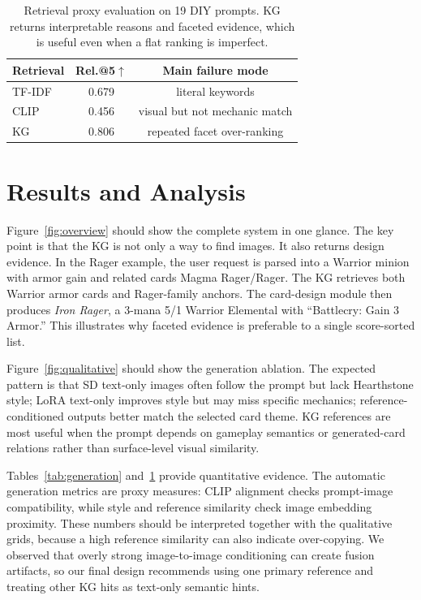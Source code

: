 \documentclass[10pt,twocolumn,letterpaper]{article}
\begin{document}
\begin{table}[t]
\centering
\small
\begin{tabular}{lcc}
\toprule
\textbf{Retrieval} & \textbf{Rel.@5}$\uparrow$ & \textbf{Main failure mode} \\
\midrule
TF-IDF & 0.679 & literal keywords \\
CLIP & 0.456 & visual but not mechanic match \\
KG & 0.806 & repeated facet over-ranking \\
\bottomrule
\end{tabular}
\caption{Retrieval proxy evaluation on 19 DIY prompts. KG returns interpretable reasons and faceted evidence, which is useful even when a flat ranking is imperfect.}
\label{tab:retrieval}
\end{table}

\section{Results and Analysis}

Figure~\ref{fig:overview} should show the complete system in one glance. The key point is that the KG is not only a way to find images. It also returns design evidence. In the Rager example, the user request is parsed into a Warrior minion with armor gain and related cards Magma Rager/Rager. The KG retrieves both Warrior armor cards and Rager-family anchors. The card-design module then produces \textit{Iron Rager}, a 3-mana 5/1 Warrior Elemental with ``Battlecry: Gain 3 Armor.'' This illustrates why faceted evidence is preferable to a single score-sorted list.

Figure~\ref{fig:qualitative} should show the generation ablation. The expected pattern is that SD text-only images often follow the prompt but lack Hearthstone style; LoRA text-only improves style but may miss specific mechanics; reference-conditioned outputs better match the selected card theme. KG references are most useful when the prompt depends on gameplay semantics or generated-card relations rather than surface-level visual similarity.

Tables~\ref{tab:generation} and~\ref{tab:retrieval} provide quantitative evidence. The automatic generation metrics are proxy measures: CLIP alignment checks prompt-image compatibility, while style and reference similarity check image embedding proximity. These numbers should be interpreted together with the qualitative grids, because a high reference similarity can also indicate over-copying. We observed that overly strong image-to-image conditioning can create fusion artifacts, so our final design recommends using one primary reference and treating other KG hits as text-only semantic hints.
\end{document}
